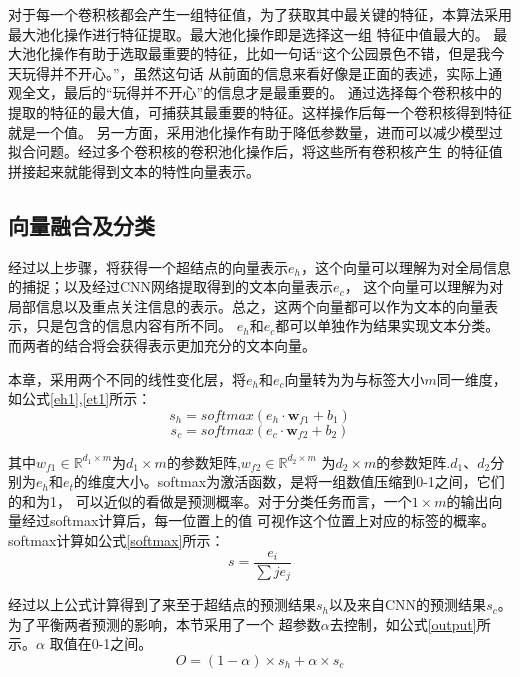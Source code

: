 对于每一个卷积核都会产生一组特征值，为了获取其中最关键的特征，本算法采用最大池化操作进行特征提取。最大池化操作即是选择这一组
特征中值最大的。
最大池化操作有助于选取最重要的特征，比如一句话“这个公园景色不错，但是我今天玩得并不开心。”，虽然这句话
从前面的信息来看好像是正面的表述，实际上通观全文，最后的“玩得并不开心”的信息才是最重要的。
通过选择每个卷积核中的提取的特征的最大值，可捕获其最重要的特征。这样操作后每一个卷积核得到特征就是一个值。
另一方面，采用池化操作有助于降低参数量，进而可以减少模型过拟合问题。经过多个卷积核的卷积池化操作后，将这些所有卷积核产生
的特征值拼接起来就能得到文本的特性向量表示。

\subsection{向量融合及分类}
经过以上步骤，将获得一个超结点的向量表示$e_h$，这个向量可以理解为对全局信息的捕捉；以及经过CNN网络提取得到的文本向量表示$e_c$，
这个向量可以理解为对局部信息以及重点关注信息的表示。总之，这两个向量都可以作为文本的向量表示，只是包含的信息内容有所不同。
$e_h$和$e_c$都可以单独作为结果实现文本分类。而两者的结合将会获得表示更加充分的文本向量。

本章，采用两个不同的线性变化层，将$e_h$和$e_c$向量转为为与标签大小$m$同一维度，如公式\ref{eh1},\ref{et1}所示：
\begin{equation}\label{eh1}
    s_h=softmax(e_h \cdot \mathbf{w}_{f1}+b_1)
\end{equation}
\begin{equation}\label{et1}
    s_c=softmax(e_c \cdot \mathbf{w}_{f2}+b_2)
\end{equation}

其中$w_{f1}\in \mathbb{R}^{d_1 \times m}$为$d_1\times m$的参数矩阵,$w_{f2}\in \mathbb{R}^{d_2 \times m}$
为$d_2\times m$的参数矩阵.$d_1$、$d_2$分别为$e_h$和$e_t$的维度大小。softmax为激活函数，是将一组数值压缩到0-1之间，它们的和为1，
可以近似的看做是预测概率。对于分类任务而言，一个$1\times m$的输出向量经过softmax计算后，每一位置上的值
可视作这个位置上对应的标签的概率。softmax计算如公式\ref{softmax}所示：
\begin{equation}\label{softmax}
    s=\frac{e_i}{\sum{j}{e_j}}
\end{equation}

经过以上公式计算得到了来至于超结点的预测结果$s_h$以及来自CNN的预测结果$s_c$。为了平衡两者预测的影响，本节采用了一个
超参数$\alpha$去控制，如公式\ref{output}所示。$\alpha$ 取值在0-1之间。
\begin{equation}\label{output}
    O=(1-\alpha) \times s_h+\alpha \times s_c
\end{equation}

